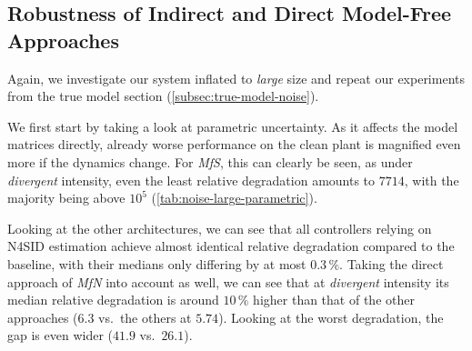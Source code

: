 \subsection{Robustness of Indirect and Direct Model-Free Approaches}
\label{subsec:noise-large-inflation}

Again, we investigate our system inflated to \emph{large} size and repeat our experiments from the
true model section (\cref{subsec:true-model-noise}).

We first start by taking a look at parametric uncertainty. As it affects the model matrices directly, already
worse performance on the clean plant is magnified even more if the dynamics change. For \emph{MfS}, this can clearly be seen, as
under \emph{divergent} intensity, even the least relative degradation amounts to $7714$,
with the majority being above $10^5$ (\cref{tab:noise-large-parametric}).

\begin{table}[htbp]
  \centering
  \caption{Median relative degradation $\kappa$ over the ten seeds under \emph{large} inflation and parametric
  uncertainty, and the range over the seeds at intensity \emph{divergent}.}
  \label{tab:noise-large-parametric}
\end{table}

Looking at the other architectures, we can see that all controllers relying on N4SID
estimation achieve almost identical relative degradation compared to the baseline, with their
medians only differing by at most $0.3\,\%$. Taking the direct
approach of \emph{MfN} into account as well, we can see that at \emph{divergent} intensity its median relative degradation
is around $10\,\%$ higher than that of the other approaches ($6.3$ vs.\ the others at $5.74$). Looking at
the worst degradation, the gap is even wider ($41.9$ vs.\ $26.1$).

